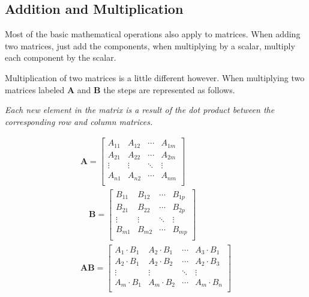     \subsection{Addition and Multiplication}
    Most of the basic mathematical operations also apply to matrices. When adding two matrices, just add the components, when multiplying by a scalar, multiply each component by the scalar.

    Multiplication of two matrices is a little different however. When multiplying two matrices labeled $\mathbf{A}$ and $\mathbf{B}$ the steps are represented as follows.

    \begin{center}
        \textit{Each new element in the matrix is a result of the dot product between the corresponding row and column matrices.}
    \end{center}
    \begin{equation}\label{eq:matrixmultiplication}
    \begin{aligned}
        \mathbf{A}=
        \left[\begin{matrix}
        A_{11} & A_{12} & \cdots & A_{1m} \\
        A_{21} & A_{22} & \cdots & A_{2m} \\
        \vdots & \vdots & \ddots & \vdots \\
        A_{n1} & A_{n2} & \cdots & A_{nm} \\
        \end{matrix}\right]\\
        \quad\mathbf{B}=
        \left[\begin{matrix}
        B_{11} & B_{12} & \cdots & B_{1p} \\
        B_{21} & B_{22} & \cdots & B_{2p} \\
        \vdots & \vdots & \ddots & \vdots \\
        B_{m1} & B_{m2} & \cdots & B_{mp} \\
        \end{matrix}\right]\\
        \mathbf{A}\mathbf{B}=
        \left[\begin{matrix}
        A_1 \cdot B_1 & A_2 \cdot B_1 & \cdots & A_3 \cdot B_1 \\
        A_2 \cdot B_1 & A_2 \cdot B_2 & \cdots & A_2 \cdot B_3 \\
        \vdots & \vdots & \ddots & \vdots \\
        A_m \cdot B_1 & A_m \cdot B_2 & \cdots & A_m \cdot B_n \\
        \end{matrix}\right]
    \end{aligned}
    \end{equation}

